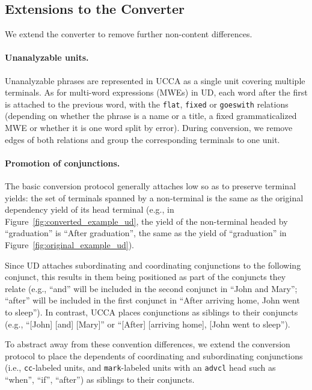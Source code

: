 \documentclass[11pt,a4paper]{article}
\begin{document}
\subsection{Extensions to the Converter}\label{sec:local}

We extend the converter to remove further non-content differences.

\paragraph{Unanalyzable units.}
Unanalyzable phrases are represented in UCCA as a single unit covering multiple terminals.
As for multi-word expressions (MWEs) in UD, each word after the first is attached to the previous word,
with the \texttt{flat}, \texttt{fixed} or \texttt{goeswith} relations
(depending on whether the phrase is a name or a title, a fixed grammaticalized MWE
or whether it is one word split by error).
During conversion, we remove edges of both relations and group the corresponding terminals to one unit.

\paragraph{Promotion of conjunctions.}
The basic conversion protocol generally attaches low so as to preserve terminal yields:
the set of terminals spanned by a non-terminal is the same
as the original dependency yield of its head terminal
(e.g., in Figure~\ref{fig:converted_example_ud}, the yield of the non-terminal
headed by ``graduation'' is ``After graduation'', the same as the yield of ``graduation''
in Figure~\ref{fig:original_example_ud}).

Since UD attaches subordinating and coordinating conjunctions to the following conjunct,
this results in them being positioned as part
of the conjuncts they relate (e.g., ``and'' will be included in the second conjunct in ``John and Mary''; 
``after'' will be included in the first conjunct in ``After arriving home, John went to sleep'').
In contrast, UCCA places conjunctions as siblings to their conjuncts (e.g., ``[John] [and] [Mary]'' or
``[After] [arriving home], [John went to sleep''). 

To abstract away from these convention differences,
we extend the conversion protocol to place 
the dependents of coordinating and subordinating conjunctions 
(i.e., \texttt{cc}-labeled units, and \texttt{mark}-labeled units with an \texttt{advcl} head such 
as ``when'', ``if'', ``after'') as siblings to their conjuncts.
\end{document}
